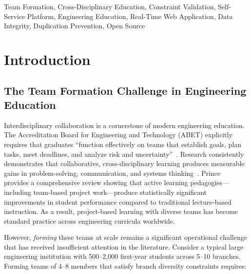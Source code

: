 \documentclass[conference]{IEEEtran}
\begin{document}
\begin{IEEEkeywords}
Team Formation, Cross-Disciplinary Education, Constraint Validation, Self-Service Platform, Engineering Education, Real-Time Web Application, Data Integrity, Duplication Prevention, Open Source
\end{IEEEkeywords}

\section{Introduction}
\label{sec:introduction}

\subsection{The Team Formation Challenge in Engineering Education}

Interdisciplinary collaboration is a cornerstone of modern engineering education. The Accreditation Board for Engineering and Technology (ABET) explicitly requires that graduates ``function effectively on teams that establish goals, plan tasks, meet deadlines, and analyze risk and uncertainty''~\cite{abet2019}. Research consistently demonstrates that collaborative, cross-disciplinary learning produces measurable gains in problem-solving, communication, and systems thinking~\cite{terenzini2001, borrego2010}. Prince~\cite{prince2004} provides a comprehensive review showing that active learning pedagogies---including team-based project work---produce statistically significant improvements in student performance compared to traditional lecture-based instruction. As a result, project-based learning with diverse teams has become standard practice across engineering curricula worldwide.

However, \textit{forming} these teams at scale remains a significant operational challenge that has received insufficient attention in the literature. Consider a typical large engineering institution with 500--2,000 first-year students across 5--10 branches. Forming teams of 4--8 members that satisfy branch diversity constraints requires:
\end{document}
